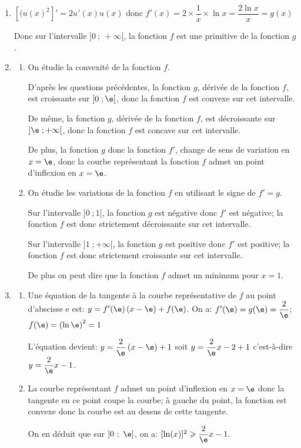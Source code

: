 \begin{enumerate}
\item 
$[(u(x)^2]' = 2u'(x)u(x)$ donc
$f'(x)= 2\times \dfrac{1}{x}\times \ln x = \dfrac{2\ln x}{x}=g(x)$

Donc sur l'intervalle $]0~;~+ \infty[$, la fonction $f$ est une primitive de la fonction $g$.

\item 
	\begin{enumerate}
		\item On étudie la convexité de la fonction $f$.
		
D'après les questions précédentes, la fonction $g$, dérivée de la fonction $f$, est croissante sur $]0\;; \e[$, donc la fonction $f$ est convexe sur cet intervalle.		
		
De même, la fonction $g$, dérivée de la fonction $f$, est décroissante sur $]\e\;; +\infty[$, donc la fonction $f$ est concave sur cet intervalle.

De plus, la fonction $g$ donc la fonction $f'$, change de sens de variation en $x=\e$, donc la courbe représentant la fonction $f$ admet un point d'inflexion en $x=\e$.
		
		\item On étudie les variations de la fonction $f$ en utilisant le signe de $f'=g$.
		
Sur l'intervalle $]0\;; 1[$, la fonction $g$ est négative donc $f'$ est négative; la fonction $f$ est donc strictement décroissante sur cet intervalle.

Sur l'intervalle $]1\;; +\infty[$, la fonction $g$ est positive donc $f'$ est positive; la fonction $f$ est donc strictement croissante sur cet intervalle.

De plus on peut dire que la fonction $f$ admet un minimum pour $x=1$.
		
\end{enumerate}
\item 
	\begin{enumerate}
		\item Une équation de la tangente à la courbe représentative de $f$ au point d'abscisse e est: $y=f'(\e)\left (x-\e\right )+f(\e)$. On a: $f'(\e) = g(\e)=\dfrac{2}{\e}$; $f(\e)=\left (\ln\e\right )^2=1$

L'équation devient: $y=\dfrac{2}{\e}\left (x-\e\right ) +1$ soit
$y=\dfrac{2}{\e}x -2+1$ c'est-à-dire $y=\dfrac{2}{\e}x-1$.
		
		\item 
La courbe représentant $f$ admet un point d'inflexion en $x=\e$ donc la tangente en ce point coupe la courbe; à gauche du point, la fonction est convexe donc la courbe est au dessus de cette tangente.

On en déduit que sur  $]0~;~\e]$, on a: $[\ln (x)]^2 \geqslant \dfrac{2}{\e}x - 1.$

	\end{enumerate}
\end{enumerate}

\bigskip

